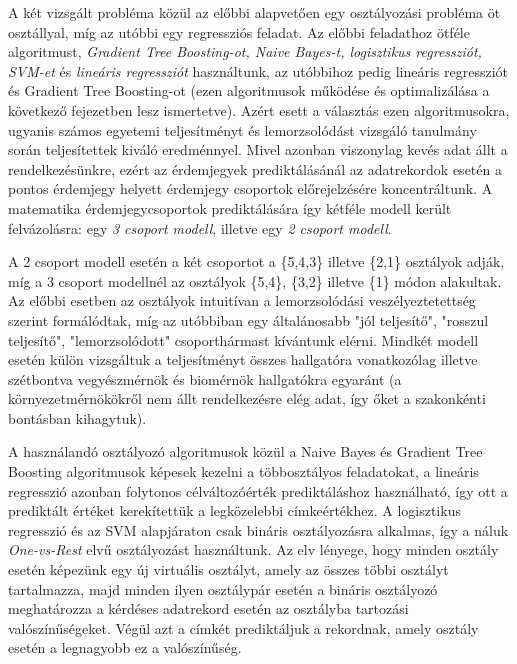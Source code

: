 \documentclass[12pt]{article}
\begin{document}
A két vizsgált probléma közül az előbbi alapvetően egy osztályozási probléma öt osztállyal, míg az utóbbi egy regressziós feladat. Az előbbi feladathoz ötféle algoritmust, \textit{Gradient Tree Boosting-ot, Naive Bayes-t, logisztikus regressziót, SVM-et} és \textit{lineáris regressziót} használtunk, az utóbbihoz pedig lineáris regressziót és Gradient Tree Boosting-ot (ezen algoritmusok működése és optimalizálása a következő fejezetben lesz ismertetve). Azért esett a választás ezen algoritmusokra, ugyanis számos egyetemi teljesítményt és lemorzsolódást vizsgáló tanulmány során teljesítettek kiváló eredménnyel.\cite{modeling1, modeling2, modeling3, modeling4} Mivel azonban viszonylag kevés adat állt a rendelkezésünkre, ezért az érdemjegyek prediktálásánál az adatrekordok esetén a pontos érdemjegy helyett érdemjegy csoportok előrejelzésére koncentráltunk. A matematika érdemjegycsoportok prediktálására így kétféle modell került felvázolásra: egy \textit{3 csoport modell}, illetve egy \textit{2 csoport modell}.

A 2 csoport modell esetén a két csoportot a \{5,4,3\} illetve \{2,1\} osztályok adják, míg a 3 csoport modellnél az osztályok \{5,4\}, \{3,2\} illetve \{1\} módon alakultak. Az előbbi esetben az osztályok intuitívan a lemorzsolódási veszélyeztetettség szerint formálódtak, míg az utóbbiban egy általánosabb "jól teljesítő", "rosszul teljesítő", "lemorzsolódott" csoporthármast kívántunk elérni. Mindkét modell esetén külön vizsgáltuk a teljesítményt összes hallgatóra vonatkozólag illetve szétbontva vegyészmérnök és biomérnök hallgatókra egyaránt (a környezetmérnökökről nem állt rendelkezésre elég adat, így őket a szakonkénti bontásban kihagytuk).

A használandó osztályozó algoritmusok közül a Naive Bayes és Gradient Tree Boosting algoritmusok képesek kezelni a többosztályos feladatokat, a lineáris regresszió azonban folytonos célváltozóérték prediktáláshoz használható, így ott a prediktált értéket kerekítettük a legközelebbi címkeértékhez. A logisztikus regresszió és az SVM alapjáraton csak bináris osztályozásra alkalmas, így a náluk \textit{One-vs-Rest} elvű osztályozást használtunk. Az elv lényege, hogy minden osztály esetén képezünk egy új virtuális osztályt, amely az összes többi osztályt tartalmazza, majd minden ilyen osztálypár esetén a bináris osztályozó meghatározza a kérdéses adatrekord esetén az osztályba tartozási valószínűségeket. Végül azt a címkét prediktáljuk a rekordnak, amely osztály esetén a legnagyobb ez a valószínűség. 
\end{document}
